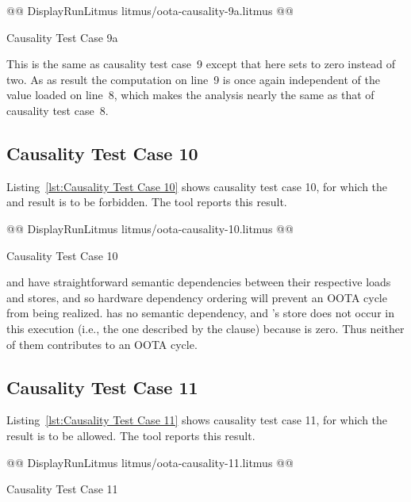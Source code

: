 \documentclass[10]{article}
\begin{document}
\begin{listing}[tbp]
@@ DisplayRunLitmus litmus/oota-causality-9a.litmus @@
\caption{Causality Test Case 9a}
\label{lst:Causality Test Case 9a}
\end{listing}

This is the same as causality test case~9 except that here 
sets  to zero instead of two.
As as result the computation on line~9 is once again independent of
the value loaded on line~8, which makes the analysis nearly the same
as that of causality test case~8.

\subsection{Causality Test Case 10}
\label{app:Causality Test Case 10}

Listing~\ref{lst:Causality Test Case 10}
shows causality test case 10, for which the  and 
result is to be forbidden.
The  tool reports this result.

\begin{listing}[tbp]
@@ DisplayRunLitmus litmus/oota-causality-10.litmus @@
\caption{Causality Test Case 10}
\label{lst:Causality Test Case 10}
\end{listing}

 and  have straightforward
semantic dependencies between their respective loads and stores, and
so hardware dependency ordering will prevent an OOTA cycle from being
realized.
 has no semantic dependency, and 's store does not
occur in this execution (i.e., the one described by the  clause)
because  is zero.
Thus neither of them contributes to an OOTA cycle.

\subsection{Causality Test Case 11}
\label{app:Causality Test Case 11}

Listing~\ref{lst:Causality Test Case 11}
shows causality test case 11, for which the 
result is to be allowed.
The  tool reports this result.

\begin{listing}[tbp]
@@ DisplayRunLitmus litmus/oota-causality-11.litmus @@
\caption{Causality Test Case 11}
\label{lst:Causality Test Case 11}
\end{listing}
\end{document}
